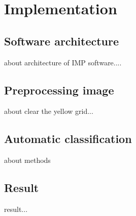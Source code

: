 \chapter{Implementation}
\section{Software architecture}
about architecture of IMP software....
\section{Preprocessing image}
about clear the yellow grid...
\section{Automatic classification }
about methods
\section{Result}
result...